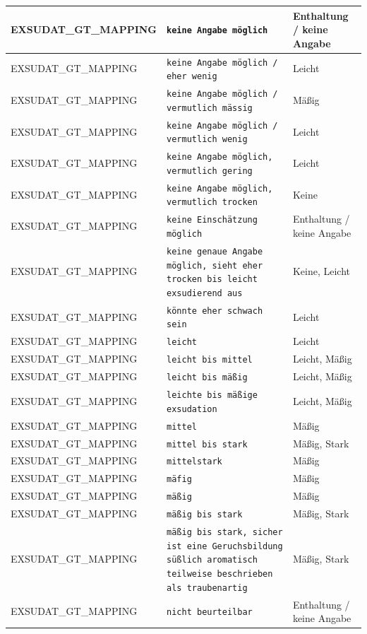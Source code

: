 \begin{longtable}{|p{3.5cm}|p{5cm}|p{6.5cm}|}
EXSUDAT\_GT\_MAPPING & \texttt{keine Angabe möglich} & Enthaltung / keine Angabe \\ \hline
EXSUDAT\_GT\_MAPPING & \texttt{keine Angabe möglich / eher wenig} & Leicht \\ \hline
EXSUDAT\_GT\_MAPPING & \texttt{keine Angabe möglich / vermutlich mässig} & Mäßig \\ \hline
EXSUDAT\_GT\_MAPPING & \texttt{keine Angabe möglich / vermutlich wenig} & Leicht \\ \hline
EXSUDAT\_GT\_MAPPING & \texttt{keine Angabe möglich, vermutlich gering} & Leicht \\ \hline
EXSUDAT\_GT\_MAPPING & \texttt{keine Angabe möglich, vermutlich trocken} & Keine \\ \hline
EXSUDAT\_GT\_MAPPING & \texttt{keine Einschätzung möglich} & Enthaltung / keine Angabe \\ \hline
EXSUDAT\_GT\_MAPPING & \texttt{keine genaue Angabe möglich, sieht eher trocken bis leicht exsudierend aus} & Keine, Leicht \\ \hline
EXSUDAT\_GT\_MAPPING & \texttt{könnte eher schwach sein} & Leicht \\ \hline
EXSUDAT\_GT\_MAPPING & \texttt{leicht} & Leicht \\ \hline
EXSUDAT\_GT\_MAPPING & \texttt{leicht bis mittel} & Leicht, Mäßig \\ \hline
EXSUDAT\_GT\_MAPPING & \texttt{leicht bis mäßig} & Leicht, Mäßig \\ \hline
EXSUDAT\_GT\_MAPPING & \texttt{leichte bis mäßige exsudation} & Leicht, Mäßig \\ \hline
EXSUDAT\_GT\_MAPPING & \texttt{mittel} & Mäßig \\ \hline
EXSUDAT\_GT\_MAPPING & \texttt{mittel bis stark} & Mäßig, Stark \\ \hline
EXSUDAT\_GT\_MAPPING & \texttt{mittelstark} & Mäßig \\ \hline
EXSUDAT\_GT\_MAPPING & \texttt{mäfig} & Mäßig \\ \hline
EXSUDAT\_GT\_MAPPING & \texttt{mäßig} & Mäßig \\ \hline
EXSUDAT\_GT\_MAPPING & \texttt{mäßig bis stark} & Mäßig, Stark \\ \hline
EXSUDAT\_GT\_MAPPING & \texttt{mäßig bis stark, sicher ist eine Geruchsbildung süßlich aromatisch teilweise beschrieben als traubenartig} & Mäßig, Stark \\ \hline
EXSUDAT\_GT\_MAPPING & \texttt{nicht beurteilbar} & Enthaltung / keine Angabe \\ \hline

\end{longtable}
